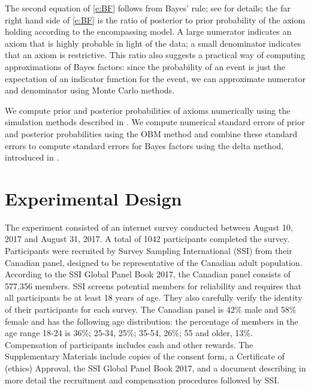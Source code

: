 \documentclass[11pt,letter]{article}
\begin{document}
The second equation of \eqref{e:BF} follows from Bayes' rule; see  for details; the far right hand side of \eqref{e:BF} is the ratio of posterior to prior probability of the axiom holding according to the encompassing model.{}
A large numerator indicates an axiom that is highly probable in light of the data; a small denominator indicates that an axiom is restrictive.
This ratio also suggests a practical way of computing approximations of Bayes factors: since the probability of an event is just the expectation of an indicator function for the event, we can approximate numerator and denominator using Monte Carlo methods.

We compute prior and posterior probabilities of axioms numerically using the simulation methods described in .
We compute numerical standard errors of prior and posterior probabilities using the OBM method and combine these standard errors to compute standard errors for Bayes factors using the delta method, introduced in .

\section{Experimental Design}\label{s:design}

The experiment consisted of an internet survey conducted between August 10, 2017 and August 31, 2017.
A total of 1042 participants completed the survey.
Participants were recruited by Survey Sampling International (SSI) from their Canadian panel, designed to be representative of the Canadian adult population.
According to the SSI Global Panel Book 2017, the Canadian panel consists of 577,356 members.
SSI screens potential members for reliability and requires that all participants be at least 18 years of age.
They also carefully verify the identity of their participants for each survey.
The Canadian panel is 42\% male and 58\% female and has the following age distribution: the percentage of members in the age range 18-24 is 36\%; 25-34, 25\%; 35-54, 26\%; 55 and older, 13\%.
Compensation of participants includes cash and other rewards.
The Supplementary Materials include copies of the consent form, a Certificate of (ethics) Approval, the SSI Global Panel Book 2017, and a document describing in more detail the recruitment and compensation procedures followed by SSI.
\end{document}
